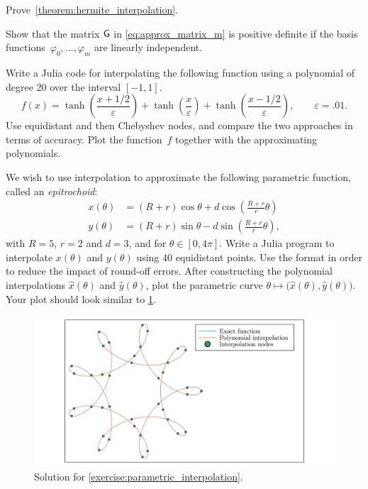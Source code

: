 \begin{exercise}
    \label{exercise:proof_hermite}
    Prove~\cref{theorem:hermite_interpolation}.
\end{exercise}

\begin{exercise}
    \label{exercise:matrix_approx}
    Show that the matrix $\mathsf G$ in \eqref{eq:approx_matrix_m} is positive definite
    if the basis functions~$\varphi_0, \dotsc, \varphi_m$ are linearly independent.
\end{exercise}

\begin{compexercise}
    Write a Julia code for interpolating the following function using a polynomial of degree 20 over the interval $[-1, 1]$.
    \[
        f(x) = \tanh\left(\frac{x+1/2}{\varepsilon}\right) + \tanh\left(\frac{x}{\varepsilon}\right) + \tanh\left(\frac{x-1/2}{\varepsilon}\right),
        \qquad \varepsilon = .01.
    \]
    Use equidistant and then Chebyshev nodes,
    and compare the two approaches in terms of accuracy.
    Plot the function~$f$ together with the approximating polynomials.
\end{compexercise}

\begin{compexercise}
    \label{exercise:parametric_interpolation}
    We wish to use interpolation to approximate the following parametric function,
    called an \emph{epitrochoid}:
    \begin{align}
        x (\theta) &= (R + r)\cos\theta + d\cos\left(\frac{R + r}{r}\theta\right) \\
      y (\theta) &= (R + r)\sin\theta - d\sin\left(\frac{R + r}{r}\theta\right),
    \end{align}
    with $R = 5$, $r = 2$ and $d = 3$, and for $\theta \in [0, 4\pi]$.
    Write a Julia program to interpolate $x(\theta)$ and $y(\theta)$ using 40 equidistant points.
    Use the  format in order to reduce the impact of round-off errors.
    After constructing the polynomial interpolations $\widehat x(\theta)$ and $\widehat y(\theta)$,
    plot the parametric curve $\theta \mapsto \bigl(\widehat x(\theta), \widehat y(\theta)\bigr)$.
    Your plot should look similar to \cref{fig:parametric_interpolation}.
    \begin{figure}[ht]
        \centering
        \includegraphics[width=0.99\linewidth]{figures/interpolation.pdf}
        \caption{Solution for \cref{exercise:parametric_interpolation}.}%
        \label{fig:parametric_interpolation}
    \end{figure}
\end{compexercise}

